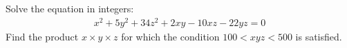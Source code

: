 Solve the equation in integers:
\begin{align*}
x^{2} + 5 y^{2} + 34 z^{2} + 2xy - 10xz - 22yz = 0
\end{align*}
Find the product $x \times y \times z$ for which the condition $100<xyz<500$ is satisfied. 